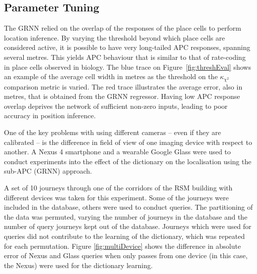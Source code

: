 \subsection{Parameter Tuning}

%		
%
%		



The GRNN relied on the overlap of the responses of the place cells to perform location inference. By varying the threshold beyond which place cells are considered active, it is possible to have very long-tailed APC responses, spanning several metres.  This yields APC behaviour that is similar to that of rate-coding in place cells observed in biology. The blue trace on Figure~\ref{fig:threshEval} shows an example of the average cell width in metres as the threshold on the $\kappa_{\chi^2}$ comparison metric is varied. The red trace illustrates the average error, also in metres, that is obtained from the GRNN regressor. Having low APC response overlap deprives the network of sufficient non-zero inputs, leading to poor accuracy in position inference.


One of the key problems with using different cameras -- even if they are calibrated -- is the difference in field of view of one imaging device with respect to another.  A Nexus 4 smartphone and a wearable Google Glass were used to conduct experiments into the effect of the dictionary on the localisation using the sub-APC (GRNN) approach. 

A set of 10 journeys through one of the corridors of the RSM building with different devices was taken for this experiment.  Some of the journeys were included in the database, others were used to conduct queries.  The partitioning of the data was permuted, varying the number of journeys in the database and the number of query journeys kept out of the database.  Journeys which were used for queries did not contribute to the learning of the dictionary, which was repeated for each permutation. Figure \ref{fig:multiDevice}  shows the difference in absolute error of Nexus and Glass queries when only passes from one device (in this case, the Nexus) were used for the dictionary learning. 


